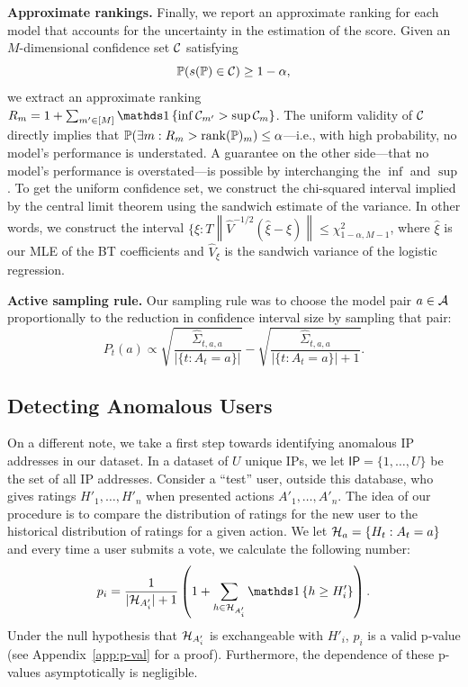 \documentclass{article}
\begin{document}
\textbf{Approximate rankings.}
Finally, we report an approximate ranking for each model that accounts for the uncertainty in the estimation of the score.
Given an $M$-dimensional confidence set $\mathcal{C}$ satisfying
\begin{equation}
    \mathbb{P}( s(\mathbb{P}) \in \mathcal{C} ) \geq 1-\alpha,
\end{equation}
we extract an approximate ranking $R_m = 1 + \sum_{m' \in [M]} \ind{\inf \cC_{m'} > \sup \cC_{m}}$.
The uniform validity of $\mathcal{C}$ directly implies that $\mathbb{P}( \exists m : R_m > \operatorname{rank}(\mathbb{P})_m ) \leq \alpha$---i.e., with high probability, no model's performance is understated.
A guarantee on the other side---that no model's performance is overstated---is possible by interchanging the $\inf$ and $\sup$.
To get the uniform confidence set, we construct the chi-squared interval implied by the central limit theorem using the sandwich estimate of the variance.
In other words, we construct the interval $\{ \xi : T\left\|\hat{V}^{-1/2}(\hat\xi - \xi)\right\| \leq \chi^2_{1-\alpha, M-1}$,
where $\hat\xi$ is our MLE of the BT coefficients and $\hat{V}_{\xi}$ is the sandwich variance of the logistic regression. 

\textbf{Active sampling rule.} Our sampling rule was to choose the model pair $a\in\mathcal{A}$ proportionally to the reduction in confidence interval size by sampling that pair:
\begin{equation}
    P_t(a) \propto \sqrt{\frac{\hat{\Sigma}_{t, a,a}}{|\{ t : A_t = a\}|}} - \sqrt{\frac{\hat{\Sigma}_{t, a,a}}{|\{ t : A_t = a\}| + 1}}.
\label{eq:adaptive}
\end{equation}

\subsection{Detecting Anomalous Users}
\label{sec:outlier}
On a different note, we take a first step towards identifying anomalous IP addresses in our dataset.
In a dataset of $U$ unique IPs, we let $\mathsf{IP} = \{1, \ldots, U\}$ be the set of all IP addresses.
Consider a ``test'' user, outside this database, who gives ratings $H'_1, \ldots, H'_n$ when presented actions $A'_1, \ldots, A'_n$.
The idea of our procedure is to compare the distribution of ratings for the new user to the historical distribution of ratings for a given action.
We let $\mathcal{H}_a = \{ H_t : A_t = a \}$ and every time a user submits a vote, we calculate the following number:
\begin{equation}
    p_i = \frac{1}{|\cH_{A'_i}|+1} \left(1 + \sum\limits_{h \in \cH_{A'_i}} \ind{h \geq H'_i}\right).
\end{equation}
Under the null hypothesis that $\mathcal{H}_{A'_i}$ is exchangeable with $H'_i$, $p_i$ is a valid p-value (see Appendix~\ref{app:p-val} for a proof).
Furthermore, the dependence of these p-values asymptotically is negligible.
\end{document}
